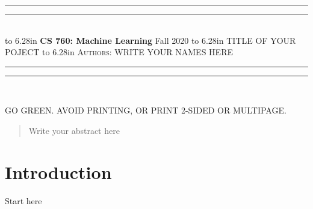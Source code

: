 \documentclass{article}
\newcommand{\lecture}[2]{
\pagestyle{myheadings}
\thispagestyle{plain}
\newpage
\noindent
\begin{center}
\rule{\textwidth}{1.6pt}\vspace*{-\baselineskip}\vspace*{2pt} %
\rule{\textwidth}{0.4pt}\\[1\baselineskip] %
\vbox{\vspace{2mm}
\hbox to 6.28in { {\bf CS 760: Machine Learning} \hfill Fall 2020 }
\vspace{4mm}
\hbox to 6.28in { {\Large \hfill #1  \hfill} }
\vspace{4mm}
\hbox to 6.28in { {\scshape Authors:}  #2 \hfill }}
\vspace{-2mm}
\rule{\textwidth}{0.4pt}\vspace*{-\baselineskip}\vspace{3.2pt} %
\rule{\textwidth}{1.6pt}\\[\baselineskip] %
\end{center}
\vspace*{4mm}
}
\begin{document}
\lecture{TITLE OF YOUR POJECT}{WRITE YOUR NAMES HERE}

\begin{center}
{\Large {\sf GO GREEN. AVOID PRINTING, OR PRINT 2-SIDED OR MULTIPAGE.}}
\end{center}

\begin{abstract}
Write your abstract here
\end{abstract}

\section{Introduction}
Start here
\end{document}
